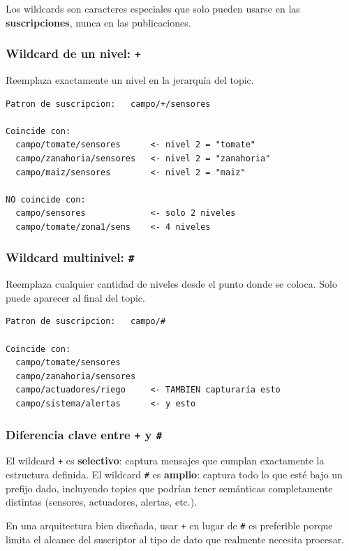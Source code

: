 \documentclass[12pt,a4paper]{article}
\begin{document}
Los wildcards son caracteres especiales que solo pueden usarse en las
\textbf{suscripciones}, nunca en las publicaciones.

\subsubsection{Wildcard de un nivel: \texttt{+}}

Reemplaza exactamente un nivel en la jerarquía del topic.

\begin{lstlisting}[style=texto]
Patron de suscripcion:   campo/+/sensores

Coincide con:
  campo/tomate/sensores      <- nivel 2 = "tomate"
  campo/zanahoria/sensores   <- nivel 2 = "zanahoria"
  campo/maiz/sensores        <- nivel 2 = "maiz"

NO coincide con:
  campo/sensores             <- solo 2 niveles
  campo/tomate/zona1/sens    <- 4 niveles
\end{lstlisting}

\subsubsection{Wildcard multinivel: \texttt{\#}}

Reemplaza cualquier cantidad de niveles desde el punto donde se coloca.
Solo puede aparecer al final del topic.

\begin{lstlisting}[style=texto]
Patron de suscripcion:   campo/#

Coincide con:
  campo/tomate/sensores
  campo/zanahoria/sensores
  campo/actuadores/riego     <- TAMBIEN capturaría esto
  campo/sistema/alertas      <- y esto
\end{lstlisting}

\subsubsection{Diferencia clave entre \texttt{+} y \texttt{\#}}

El wildcard \texttt{+} es \textbf{selectivo}: captura mensajes que cumplan
exactamente la estructura definida. El wildcard \texttt{\#} es \textbf{amplio}:
captura todo lo que esté bajo un prefijo dado, incluyendo topics que podrían
tener semánticas completamente distintas (sensores, actuadores, alertas, etc.).

En una arquitectura bien diseñada, usar \texttt{+} en lugar de \texttt{\#}
es preferible porque limita el alcance del suscriptor al tipo de dato
que realmente necesita procesar.
\end{document}
